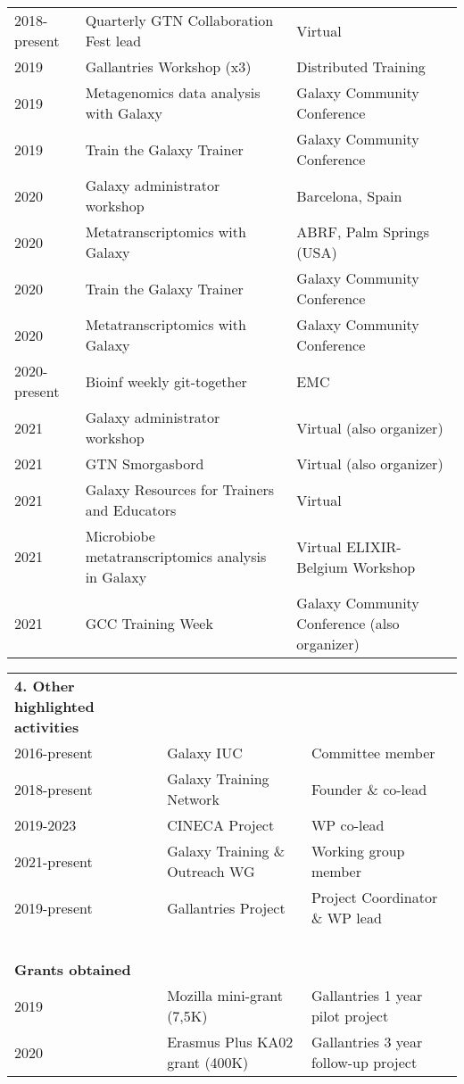 \begin{table}[h!]
\begin{tabular}{lll}
        2018-present & Quarterly GTN Collaboration Fest lead      & Virtual \\
        2019 & Gallantries Workshop (x3)                       & Distributed Training \\
        2019 & Metagenomics data analysis with Galaxy          & Galaxy Community Conference \\
        2019 & Train the Galaxy Trainer                        & Galaxy Community Conference \\
        2020 & Galaxy administrator workshop                   & Barcelona, Spain \\
        2020 & Metatranscriptomics with Galaxy                 & ABRF, Palm Springs (USA) \\
        2020 & Train the Galaxy Trainer                        & Galaxy Community Conference \\
        2020 & Metatranscriptomics with Galaxy                 & Galaxy Community Conference \\
        2020-present & Bioinf weekly git-together              & EMC \\
        2021 & Galaxy administrator workshop                   & Virtual (also organizer) \\
        2021 & GTN Smorgasbord                                 & Virtual (also organizer) \\
        2021 & Galaxy Resources for Trainers and Educators     & Virtual  \\
        2021 & Microbiobe metatranscriptomics analysis in Galaxy  & Virtual ELIXIR-Belgium Workshop \\
        2021 & GCC Training Week                               & Galaxy Community Conference (also organizer) \\
    \end{tabular}
\end{table}

\begin{table}
    \begin{tabular}{lll}
        \textbf{4.  Other highlighted activities} \\

        2016-present & Galaxy IUC & Committee member \\
        2018-present & Galaxy Training Network & Founder \& co-lead  \\
        2019-2023 & CINECA Project & WP co-lead  \\
        2021-present & Galaxy Training \& Outreach WG & Working group member \\
        2019-present & Gallantries Project & Project Coordinator \& WP lead \\
        \ \\
        \textbf{Grants obtained} \\
         2019 & Mozilla mini-grant (7,5K) & Gallantries 1 year pilot project  \\
         2020 & Erasmus Plus KA02 grant (400K) & Gallantries 3 year follow-up project \\
    \end{tabular}
\end{table}



\normalsize
